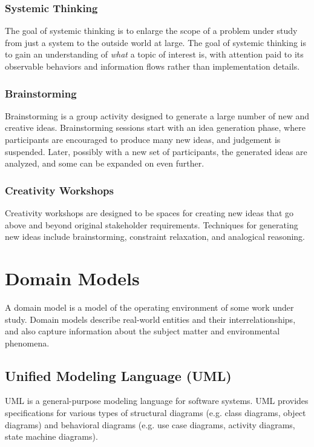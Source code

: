 \documentclass[12pt,titlepage]{article}
\begin{document}
      \subsubsection{Systemic Thinking}
        The goal of systemic thinking is to enlarge the scope of a problem under study from just a system to the outside world at large. The goal of systemic thinking is to
        gain an understanding of \textit{what} a topic of interest is, with attention paid to its observable behaviors and information flows rather than implementation
        details.

      \subsubsection{Brainstorming}
        Brainstorming is a group activity designed to generate a large number of new and creative ideas. Brainstorming sessions start with an idea generation phase, where
        participants are encouraged to produce many new ideas, and judgement is suspended. Later, possibly with a new set of participants, the generated ideas are analyzed,
        and some can be expanded on even further.

      \subsubsection{Creativity Workshops}
        Creativity workshops are designed to be spaces for creating new ideas that go above and beyond original stakeholder requirements. Techniques for generating new ideas
        include brainstorming, constraint relaxation, and analogical reasoning.

  \newpage

  \section{Domain Models}
    A domain model is a model of the operating environment of some work under study. Domain models describe real-world entities and their interrelationships, and also capture
    information about the subject matter and environmental phenomena.

    \subsection{Unified Modeling Language (UML)}
      UML is a general-purpose modeling language for software systems. UML provides specifications for various types of structural diagrams (e.g. class diagrams, object diagrams)
      and behavioral diagrams (e.g. use case diagrams, activity diagrams, state machine diagrams).
      
\end{document}
